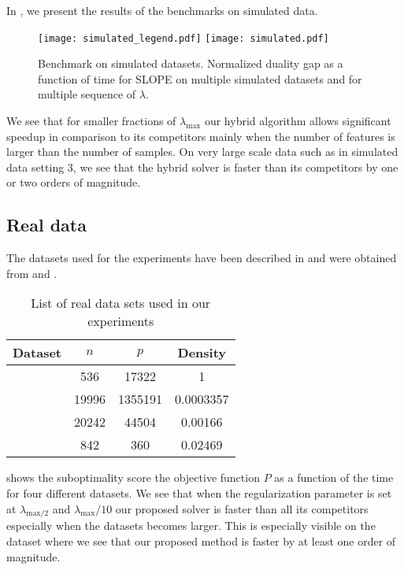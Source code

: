 In , we present the results of the benchmarks on simulated data.

\begin{figure*}[!t]
  \centering
  \texttt{[image: simulated\_legend.pdf]}
  \texttt{[image: simulated.pdf]}
  \caption{Benchmark on simulated datasets. Normalized duality gap as a function of time for SLOPE on multiple simulated datasets and for multiple sequence of $\lambda$.}
  \label{fig:simulated}
\end{figure*}

We see that for smaller fractions of $\lambda_{\text{max}}$ our hybrid algorithm allows significant speedup in comparison to its competitors mainly when the number of features is larger than the number of samples.
On very large scale data such as in simulated data setting $3$, we see that the hybrid solver is faster than its competitors by one or two orders of magnitude.

\subsection{Real data}
\label{sec:experiments-real-data}

The datasets used for the experiments have been described in  and were obtained from \textcite{chang2011,chang2016} and \textcite{breheny2022}.

\begin{table}[hbt]
  \centering
  \caption{List of real data sets used in our experiments}
  \label{tab:real-data}
  \begin{tabular}{
      l
      S[table-format=5.0,round-mode=off]
      S[table-format=7.0,round-mode=off]
      S[table-format=1.5,round-mode=figures,round-precision=2]
    }
    \toprule
    Dataset            & {\(n\)} & {\(p\)} & {Density} \\ \midrule
       & 536     & 17322   & 1         \\
       & 19996   & 1355191 & 0.0003357 \\
         & 20242   & 44504   & 0.00166   \\
     & 842     & 360     & 0.02469   \\ \bottomrule
  \end{tabular}
\end{table}

 shows the suboptimality score the objective function $P$ as a function of the time for four different datasets.
We see that when the regularization parameter is set at $\lambda_{\text{max}/2}$ and $\lambda_{\text{max}}/10$ our proposed solver is faster than all its competitors especially when the datasets becomes larger.
This is especially visible on the  dataset where we see that our proposed method is faster by at least one order of magnitude.

